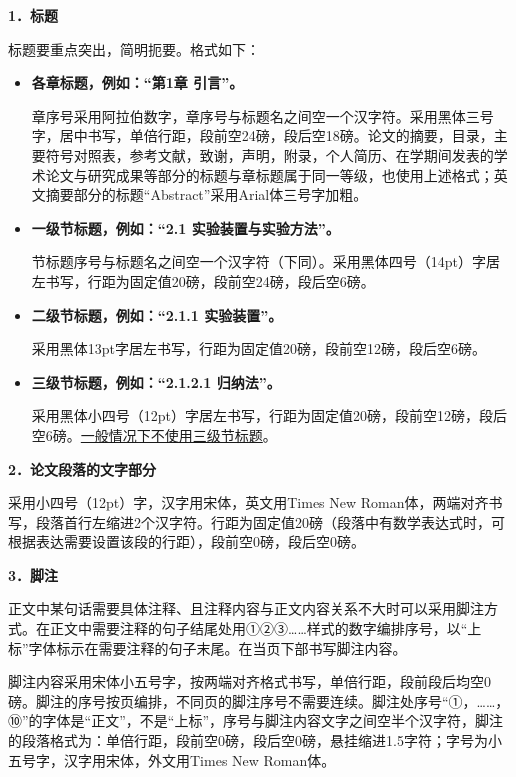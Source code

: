 \textbf{1．标题}

标题要重点突出，简明扼要。格式如下：

\begin{itemize}
  \item \textbf{各章标题，例如：“第1章  引言”。}
  
  章序号采用阿拉伯数字，章序号与标题名之间空一个汉字符。采用黑体三号字，居中书写，单倍行距，段前空24磅，段后空18磅。论文的摘要，目录，主要符号对照表，参考文献，致谢，声明，附录，个人简历、在学期间发表的学术论文与研究成果等部分的标题与章标题属于同一等级，也使用上述格式；英文摘要部分的标题“Abstract”采用Arial体三号字加粗。
  
  \item \textbf{一级节标题，例如：“2.1  实验装置与实验方法”。}
  
  节标题序号与标题名之间空一个汉字符（下同）。采用黑体四号（14pt）字居左书写，行距为固定值20磅，段前空24磅，段后空6磅。
  
  \item \textbf{二级节标题，例如：“2.1.1  实验装置”。}
  
  采用黑体13pt字居左书写，行距为固定值20磅，段前空12磅，段后空6磅。 
  
  \item \textbf{三级节标题，例如：“2.1.2.1  归纳法”。}
  
  采用黑体小四号（12pt）字居左书写，行距为固定值20磅，段前空12磅，段后空6磅。\underline{一般情况下不使用三级节标题}。
  
\end{itemize}

\textbf{2．论文段落的文字部分}

采用小四号（12pt）字，汉字用宋体，英文用Times New Roman体，两端对齐书写，段落首行左缩进2个汉字符。行距为固定值20磅（段落中有数学表达式时，可根据表达需要设置该段的行距），段前空0磅，段后空0磅。

\textbf{3．脚注}

正文中某句话需要具体注释、且注释内容与正文内容关系不大时可以采用脚注方式。在正文中需要注释的句子结尾处用①②③……样式的数字编排序号，以“上标”字体标示在需要注释的句子末尾。在当页下部书写脚注内容。

脚注内容采用宋体小五号字，按两端对齐格式书写，单倍行距，段前段后均空0磅。脚注的序号按页编排，不同页的脚注序号不需要连续。脚注处序号“①，……，⑩”的字体是“正文”，不是“上标”，序号与脚注内容文字之间空半个汉字符，脚注的段落格式为：单倍行距，段前空0磅，段后空0磅，悬挂缩进1.5字符；字号为小五号字，汉字用宋体，外文用Times New Roman体。

